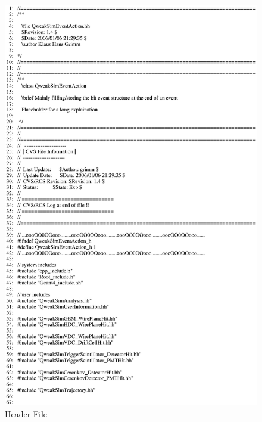 \clearpage

\begin{figure}[h]
  \hspace{0cm}
  \includegraphics[scale=0.8]{./figures13/QweakSimEventAction.hh-p1.eps}
  \caption{Header File}
           \label{fig:XIII-SC-11}
\end{figure}

\clearpage

